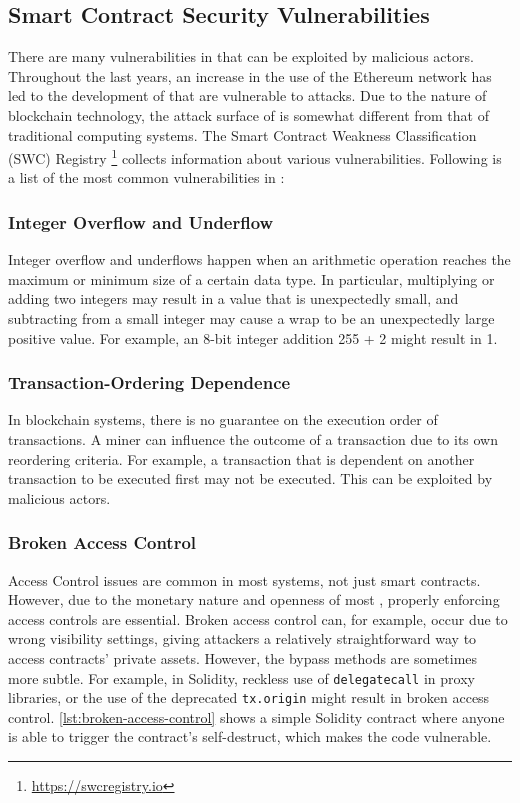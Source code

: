 \subsection{Smart Contract Security Vulnerabilities}
\label{sec:smart-contract-vulnerabilities}
There are many vulnerabilities in  that can be exploited by malicious actors. Throughout the last years, an increase in the use of the Ethereum network has led to the development of  that are vulnerable to attacks. Due to the nature of blockchain technology, the attack surface of  is somewhat different from that of traditional computing systems. The Smart Contract Weakness Classification (SWC) Registry \footnote{\url{https://swcregistry.io}} collects information about various vulnerabilities. Following is a list of the most common vulnerabilities in :

\subsubsection{Integer Overflow and Underflow}
Integer overflow and underflows happen when an arithmetic operation reaches the maximum or minimum size of a certain data type. In particular, multiplying or adding two integers may result in a value that is unexpectedly small, and subtracting from a small integer may cause a wrap to be an unexpectedly large positive value. For example, an 8-bit integer addition 255 + 2 might result in 1.

\subsubsection{Transaction-Ordering Dependence}
In blockchain systems, there is no guarantee on the execution order of transactions. A miner can influence the outcome of a transaction due to its own reordering criteria. For example, a transaction that is dependent on another transaction to be executed first may not be executed. This can be exploited by malicious actors. 

\subsubsection{Broken Access Control}
Access Control issues are common in most systems, not just smart contracts. However, due to the monetary nature and openness of most , properly enforcing access controls are essential. Broken access control can, for example, occur due to wrong visibility settings, giving attackers a relatively straightforward way to access contracts' private assets. However, the bypass methods are sometimes more subtle. For example, in Solidity, reckless use of \lstinline[language=Solidity]!delegatecall! in proxy libraries, or the use of the deprecated \lstinline[language=Solidity]!tx.origin! might result in broken access control. \cref{lst:broken-access-control} shows a simple Solidity contract where anyone is able to trigger the contract's self-destruct, which makes the code vulnerable.

